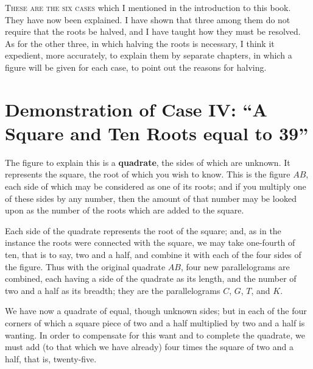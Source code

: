 \documentclass[11pt,a4paper]{book}
\begin{document}
\begin{minipage}[t]{0.48\textwidth}
\raggedright

\lettrine[lines=2, lhang=0.33, nindent=0em, findent=3pt, loversize=0.14]{
\textcolor{dropgold}{T}}{hese are the six cases} which I mentioned in the introduction to this book. They have now been explained. I have shown that three among them do not require that the roots be halved, and I have taught how they must be resolved. As for the other three, in which halving the roots is necessary, I think it expedient, more accurately, to explain them by separate chapters, in which a figure will be given for each case, to point out the reasons for halving.

\section*{Demonstration of Case IV: ``A Square and Ten Roots equal to 39''}

The figure to explain this is a \textbf{quadrate}, the sides of which are unknown. It represents the square, the root of which you wish to know. This is the figure $AB$, each side of which may be considered as one of its roots; and if you multiply one of these sides by any number, then the amount of that number may be looked upon as the number of the roots which are added to the square.

Each side of the quadrate represents the root of the square; and, as in the instance the roots were connected with the square, we may take one-fourth of ten, that is to say, two and a half, and combine it with each of the four sides of the figure. Thus with the original quadrate $AB$, four new parallelograms are combined, each having a side of the quadrate as its length, and the number of two and a half as its breadth; they are the parallelograms $C$, $G$, $T$, and $K$.

We have now a quadrate of equal, though unknown sides; but in each of the four corners of which a square piece of two and a half multiplied by two and a half is wanting. In order to compensate for this want and to complete the quadrate, we must add (to that which we have already) four times the square of two and a half, that is, twenty-five.

\end{minipage}
\vspace{0.3cm}
\end{document}
